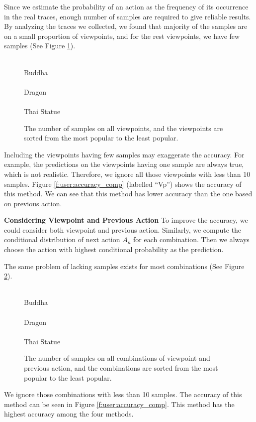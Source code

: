 Since we estimate the probability of an action as the frequency 
of its occurrence in the real traces, 
enough number of samples are required to give reliable results. 
By analyzing the traces we collected, we found that majority of the samples are 
on a small proportion of viewpoints, and for the rest viewpoints, we have few
samples (See Figure \ref{f:user:sample_size_1}).
\begin{figure}
    \centering
    \\
    Buddha\\
    \\
    Dragon\\
    \\
    Thai Statue
    \caption{The number of samples on all viewpoints, and the viewpoints are sorted from the most popular to the least popular.}
    \label{f:user:sample_size_1}
\end{figure}
Including the viewpoints having few samples may exaggerate the accuracy.
For example, the predictions on the viewpoints having one sample are 
always true, which is not realistic.
Therefore, we ignore all those viewpoints with less than 10 samples.
Figure \ref{f:user:accuracy_comp} (labelled ``Vp'') shows the accuracy of this method.
We can see that this method has lower accuracy than the one based on previous action.

\textbf{Considering Viewpoint and Previous Action}
To improve the accuracy, we could consider both viewpoint and previous action.
Similarly, we compute the conditional distribution of next action $A_n$ for each combination. 
Then we always choose the action with highest conditional probability as the prediction.

The same problem of lacking samples exists for most combinations (See Figure \ref{f:user:sample_size_2}).
\begin{figure}
    \centering
    \\
    Buddha\\
    \\
    Dragon\\
    \\
    Thai Statue
    \caption{The number of samples on all combinations of viewpoint and previous action, and the combinations are sorted from the most popular to the least popular.}
    \label{f:user:sample_size_2}
\end{figure}
We ignore those combinations with  less than 10 samples.
The accuracy of this method can be seen in Figure \ref{f:user:accuracy_comp}.
This method has the highest accuracy among the four methods.

